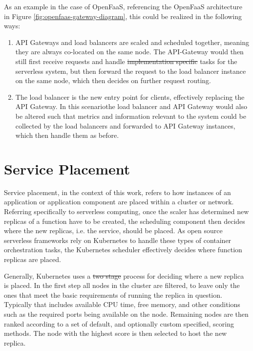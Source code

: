 \documentclass[draft,final]{vutinfth} %
\providecommand{\DIFaddtex}[1]{{\protect\color{blue}\uwave{#1}}} %
\providecommand{\DIFdeltex}[1]{{\protect\color{red}\sout{#1}}}                      %
\providecommand{\DIFaddbegin}{} %
\providecommand{\DIFaddend}{} %
\providecommand{\DIFdelbegin}{} %
\providecommand{\DIFdelend}{} %
\providecommand{\DIFadd}[1]{\texorpdfstring{\DIFaddtex{#1}}{#1}} %
\providecommand{\DIFdel}[1]{\texorpdfstring{\DIFdeltex{#1}}{}} %
\begin{document}
As an example in the case of OpenFaaS, referencing the OpenFaaS architecture in Figure \ref{fig:openfaas-gateway-diagram}, this could be realized in the following ways:
\begin{enumerate}
    \item API Gateways and load balancers are scaled and scheduled together, meaning they are always co-located on the same node. The API-Gateway would then still first receive requests and handle \DIFdelbegin \DIFdel{implementation specific }\DIFdelend \DIFaddbegin \DIFadd{implementation-specific }\DIFaddend tasks for the serverless system, but then forward the request to the load balancer instance on the same node, which then decides on further request routing.
    \item The load balancer is the new entry point for clients, effectively replacing the API Gateway. In this scenario\DIFaddbegin \DIFadd{, }\DIFaddend the load balancer and API Gateway would also be altered such that metrics and information relevant to the system could be collected by the load balancers and forwarded to API Gateway instances, which then handle them as before.
\end{enumerate}
\section{Service Placement}
Service placement, in the context of this work, refers to how instances of an application or application component are placed within a cluster or network.
Referring specifically to serverless computing, once the scaler has determined new replicas of a function have to be created, the scheduling component then decides where the new replicas, i.e. the service, should be placed.
As open source serverless frameworks rely on Kubernetes to handle these types of container orchestration tasks\cite{mohantyEvaluationOpenSource2018}, the Kubernetes scheduler effectively decides where function replicas are placed.

Generally, Kubernetes uses a \DIFdelbegin \DIFdel{two stage }\DIFdelend \DIFaddbegin \DIFadd{two-stage }\DIFaddend process for deciding where a new replica is placed.
In the first step all nodes in the cluster are filtered, to leave only the ones that meet the basic requirements of running the replica in question.
Typically that includes available CPU time, free memory, and other conditions such as the required ports being available on the node.
Remaining nodes are then ranked according to a set of default, and optionally custom specified, scoring methods.
The node with the highest score is then selected to host the new replica.
\end{document}
